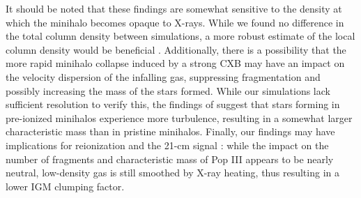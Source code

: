 \documentclass[../thesis.tex]{subfiles}
\begin{document}
It should be noted that these findings are somewhat sensitive to the density at which the minihalo becomes opaque to X-rays.  While we found no difference in the total column density between simulations, a more robust estimate of the local column density would be beneficial \citep[e.g.,][]{Hartwigetal2015, Safranek-Shraderetal2012}. Additionally, there is a possibility that the more rapid minihalo collapse induced by a strong CXB may have an impact on the velocity dispersion of the infalling gas, suppressing fragmentation and possibly increasing the mass of the stars formed. While our simulations lack sufficient resolution to verify this, the findings of \citet{Clarketal2011a} suggest that stars forming in pre-ionized minihalos experience more turbulence, resulting in a somewhat larger characteristic mass than in pristine minihalos. Finally, our findings may have implications for reionization and the 21-cm signal \citep{FurlanettoPengBriggs2006, Mirocha2014}: while the impact on the number of fragments and characteristic mass of Pop III appears to be nearly neutral, low-density gas is still smoothed by X-ray heating, thus resulting in a lower IGM clumping factor.
\end{document}
